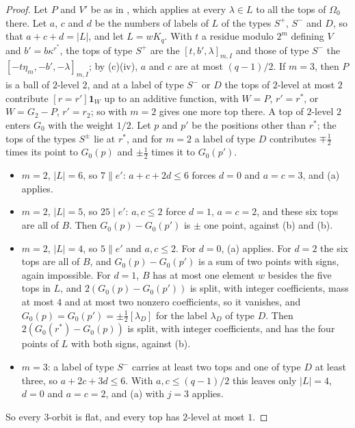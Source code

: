 \begin{proof}
Let $P$ and $V'$ be as in , which applies at every
$\lambda\in L$ to all the tops of $\Omega_{0}$ there. Let $a$, $c$ and $d$
be the numbers of labels of $L$ of the types $S^{+}$, $S^{-}$ and $D$, so
that $a+c+d=|L|$, and let $L=wK_{q}$. With $t$ a residue modulo $2^{m}$
defining $V$ and $b'=b\kappa^{r^{*}}$, the tops of type $S^{+}$ are the
$[t,b',\lambda]_{m,I}$ and those of type $S^{-}$ the
$[-t\eta_{m},-b',-\lambda]_{m,I}$; by (c)(iv), $a$ and
$c$ are at most $(q-1)/2$. If $m=3$, then $P$ is a ball of $2$-level $2$, and
at a label of type $S^{-}$ or $D$ the tops of $2$-level at most $2$ contribute
$[r=r']\mathbf 1_{W}$ up to an additive function, with $W=P$, $r'=r^{*}$, or
$W=G_{2}-P$, $r'=r_{2}$; so  with $m=2$ gives one
more top there. A top of $2$-level $2$ enters $G_{0}$ with the weight $1/2$.
Let $p$ and $p'$ be the positions other than $r^{*}$; the tops of the types
$S^{\pm}$ lie at $r^{*}$, and for $m=2$ a label of type $D$ contributes
$\mp\frac12$ times its point to $G_{0}(p)$ and $\pm\frac12$ times it to
$G_{0}(p')$.
\begin{itemize}
\item $m=2$, $|L|=6$, so $7\parallel e'$: $a+c+2d\le6$ forces $d=0$ and
$a=c=3$, and (a) applies.
\item $m=2$, $|L|=5$, so $25\mid e'$: $a,c\le2$ force $d=1$, $a=c=2$, and
these six tops are all of $B$. Then $G_{0}(p)-G_{0}(p')$ is $\pm$ one point,
against (b) and (b).
\item $m=2$, $|L|=4$, so $5\parallel e'$ and $a,c\le2$. For $d=0$,
(a) applies. For $d=2$ the six tops are all of $B$, and
$G_{0}(p)-G_{0}(p')$ is a sum of two points with signs, again impossible. For
$d=1$, $B$ has at most one element $w$ besides the five tops in $L$, and
$2(G_{0}(p)-G_{0}(p'))$ is split, with integer coefficients, mass at most
$4$ and at most two nonzero coefficients, so it vanishes, and $G_{0}(p)=G_{0}(p')=\pm\frac12[\lambda_{D}]$ for the label
$\lambda_{D}$ of type $D$. Then $2(G_{0}(r^{*})-G_{0}(p))$ is split, with
integer coefficients, and has the four points of $L$ with both signs,
against (b).
\item $m=3$: a label of type $S^{-}$ carries at least two tops and one of
type $D$ at least three, so $a+2c+3d\le6$. With $a,c\le(q-1)/2$ this leaves
only $|L|=4$, $d=0$ and $a=c=2$, and (a) with $j=3$
applies.
\end{itemize}
So every $3$-orbit is flat, and every top has $2$-level at most $1$.


\end{proof}
